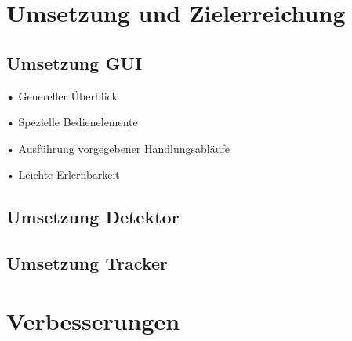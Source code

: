 \section{Umsetzung und Zielerreichung}

\subsection*{Umsetzung GUI}
•	Genereller Überblick

•	Spezielle Bedienelemente

•	Ausführung vorgegebener Handlungsabläufe

•	Leichte Erlernbarkeit


\subsection*{Umsetzung Detektor}

\subsection*{Umsetzung Tracker}

\section{Verbesserungen}
